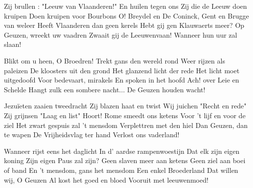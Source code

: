 \footnotemark [
ititle={Geuzenlied}]


\beginverse
Zij brullen : "Leeuw van Vlaanderen!"
En huilen tegen ons
Zij die de Leeuw doen kruipen
Doen kruipen voor Bourbons
O! Breydel en De Coninck,
Gent en Brugge van weleer
Heeft Vlaanderen dan geen kerels 
Hebt gij gen Klauwaerts meer?
Op Geuzen, wreekt uw vaadren
Zwaait gij de Leeuwenvaan!
{Wanneer hun uur zal slaan!}
\endverse

\beginverse
Blikt om u heen, O Broedren!
Trekt gans den wereld rond
Weer rijzen als paleizen
De kloosters uit den grond
Het glanzend licht der rede
Het licht moet uitgedoofd
Voor bedevaart, mirakels
En spoken in het hoofd
Ach! over Leie en Schelde
Hangt zulk een sombere nacht...
{De Geuzen houden wacht!}
\endverse

\beginverse
Jezuïeten zaaien tweedracht
Zij blazen haat en twist
Wij juichen "Recht en rede"
Zij grijnsen "Laag en list"
Hoort! Rome smeedt ons ketens
Voor 't lijf en voor de ziel
Het zwart gespuis zal 't mensdom
Verplettren met den hiel
Dan Geuzen, dan te wapen
De Vrijheidsvlag ter hand
{Verlost ons vaderland!}
\endverse

\beginverse
Wanneer rijst eens het daglicht
In d' aardse rampenwoestijn
Dat elk zijn eigen koning
Zijn eigen Paus zal zijn?
Geen slaven meer aan ketens
Geen ziel aan boei of band
En 't mensdom, gans het mensdom
Een enkel Broederland
Dat willen wij, O Geuzen
Al kost het goed en bloed
{Vooruit met leeuwenmoed!}
\endverse
\endsong